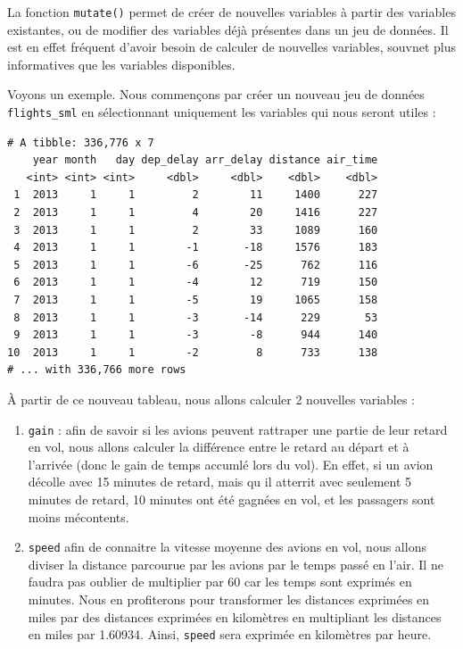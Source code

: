 \documentclass[a4paperpaper,]{article}
\newenvironment{Shaded}{\begin{snugshade}}{\end{snugshade}}
\newcommand{\KeywordTok}[1]{\textcolor[rgb]{0.12,0.11,0.11}{\textbf{#1}}}
\newcommand{\NormalTok}[1]{\textcolor[rgb]{0.12,0.11,0.11}{#1}}
\newcommand{\OperatorTok}[1]{\textcolor[rgb]{0.12,0.11,0.11}{#1}}
\newcommand{\StringTok}[1]{\textcolor[rgb]{0.75,0.01,0.01}{#1}}
\providecommand{\tightlist}{%
  \setlength{\itemsep}{0pt}\setlength{\parskip}{0pt}}
\begin{document}
La fonction \texttt{mutate()} permet de créer de nouvelles variables à partir des variables existantes, ou de modifier des variables déjà présentes dans un jeu de données. Il est en effet fréquent d'avoir besoin de calculer de nouvelles variables, souvnet plus informatives que les variables disponibles.

Voyons un exemple. Nous commençons par créer un nouveau jeu de données \texttt{flights\_sml} en sélectionnant uniquement les variables qui nous seront utiles :

\begin{Shaded}
\end{Shaded}

\begin{verbatim}
# A tibble: 336,776 x 7
    year month   day dep_delay arr_delay distance air_time
   <int> <int> <int>     <dbl>     <dbl>    <dbl>    <dbl>
 1  2013     1     1         2        11     1400      227
 2  2013     1     1         4        20     1416      227
 3  2013     1     1         2        33     1089      160
 4  2013     1     1        -1       -18     1576      183
 5  2013     1     1        -6       -25      762      116
 6  2013     1     1        -4        12      719      150
 7  2013     1     1        -5        19     1065      158
 8  2013     1     1        -3       -14      229       53
 9  2013     1     1        -3        -8      944      140
10  2013     1     1        -2         8      733      138
# ... with 336,766 more rows
\end{verbatim}

À partir de ce nouveau tableau, nous allons calculer 2 nouvelles variables :

\begin{enumerate}
\def\labelenumi{\arabic{enumi}.}
\tightlist
\item
  \texttt{gain} : afin de savoir si les avions peuvent rattraper une partie de leur retard en vol, nous allons calculer la différence entre le retard au départ et à l'arrivée (donc le gain de temps accumlé lors du vol). En effet, si un avion décolle avec 15 minutes de retard, mais qu
  il atterrit avec seulement 5 minutes de retard, 10 minutes ont été gagnées en vol, et les passagers sont moins mécontents.
\item
  \texttt{speed} afin de connaitre la vitesse moyenne des avions en vol, nous allons diviser la distance parcourue par les avions par le temps passé en l'air. Il ne faudra pas oublier de multiplier par 60 car les temps sont exprimés en minutes. Nous en profiterons pour transformer les distances exprimées en miles par des distances exprimées en kilomètres en multipliant les distances en miles par 1.60934. Ainsi, \texttt{speed} sera exprimée en kilomètres par heure.
\end{enumerate}
\end{document}
